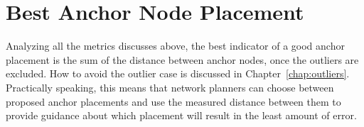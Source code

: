 \section{Best Anchor Node Placement}

Analyzing all the metrics discusses above, the best indicator of a good anchor placement is the sum of the distance between anchor nodes, once the outliers are excluded.  How to avoid the outlier case is discussed in Chapter~\ref{chap:outliers}.  Practically speaking, this means that network planners can choose between proposed anchor placements and use the measured distance between them to provide guidance about which placement will result in the least amount of error.